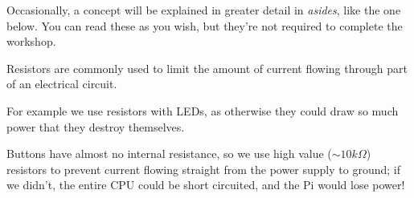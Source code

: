 Occasionally, a concept will be explained in greater detail in \textit{asides}, like the one below. You can read these as you wish, but they're not required to complete the workshop.
	
\begin{aside}[Resistors]
	Resistors are commonly used to limit the amount of current flowing through part of an electrical circuit.
	
	For example we use resistors with LEDs, as otherwise they could draw so much power that they destroy themselves.
	
	Buttons have almost no internal resistance, so we use high value ($\sim 10  k\Omega$) resistors to prevent current flowing straight from the power supply to ground; if we didn't, the entire CPU could be short circuited, and the Pi would lose power!
\end{aside}